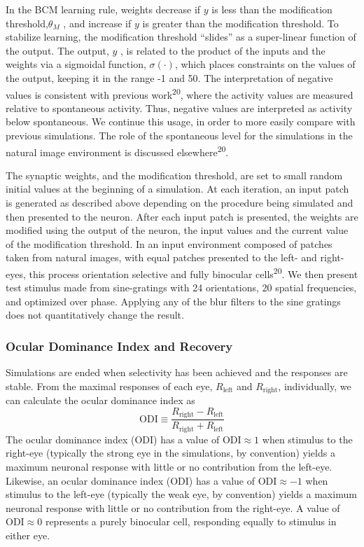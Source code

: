 \documentclass[
]{article}
\begin{document}
In the BCM learning rule, weights decrease if \(y\) is less than the
modification threshold,\(\theta_M\) , and increase if \(y\) is greater
than the modification threshold. To stabilize learning, the modification
threshold ``slides'' as a super-linear function of the output. The
output, \(y\) , is related to the product of the inputs and the weights
via a sigmoidal function, \(\sigma(\cdot)\), which places constraints on
the values of the output, keeping it in the range -1 and 50. The
interpretation of negative values is consistent with previous
work\textsuperscript{20}, where the activity values are measured
relative to spontaneous activity. Thus, negative values are interpreted
as activity below spontaneous. We continue this usage, in order to more
easily compare with previous simulations. The role of the spontaneous
level for the simulations in the natural image environment is discussed
elsewhere\textsuperscript{20}.

The synaptic weights, and the modification threshold, are set to small
random initial values at the beginning of a simulation. At each
iteration, an input patch is generated as described above depending on
the procedure being simulated and then presented to the neuron. After
each input patch is presented, the weights are modified using the output
of the neuron, the input values and the current value of the
modification threshold. In an input environment composed of patches
taken from natural images, with equal patches presented to the left- and
right-eyes, this process orientation selective and fully binocular
cells\textsuperscript{20}. We then present test stimulus made from
sine-gratings with 24 orientations, 20 spatial frequencies, and
optimized over phase. Applying any of the blur filters to the sine
gratings does not quantitatively change the result.

\subsubsection{Ocular Dominance Index and
Recovery}\label{sec:ocular-dominance-index-and-recovery}

Simulations are ended when selectivity has been achieved and the
responses are stable. From the maximal responses of each eye,
\(R_{\text{left}}\) and \(R_{\text{right}}\), individually, we can
calculate the ocular dominance index as \[
\text{ODI} \equiv \frac{R_{\text{right}}-R_{\text{left}}}{R_{\text{right}}+R_{\text{left}}}
\] The ocular dominance index (ODI) has a value of
\(\text{ODI} \approx 1\) when stimulus to the right-eye (typically the
strong eye in the simulations, by convention) yields a maximum neuronal
response with little or no contribution from the left-eye. Likewise, an
ocular dominance index (ODI) has a value of \(\text{ODI} \approx -1\)
when stimulus to the left-eye (typically the weak eye, by convention)
yields a maximum neuronal response with little or no contribution from
the right-eye. A value of \(\text{ODI} \approx 0\) represents a purely
binocular cell, responding equally to stimulus in either eye.
\end{document}
